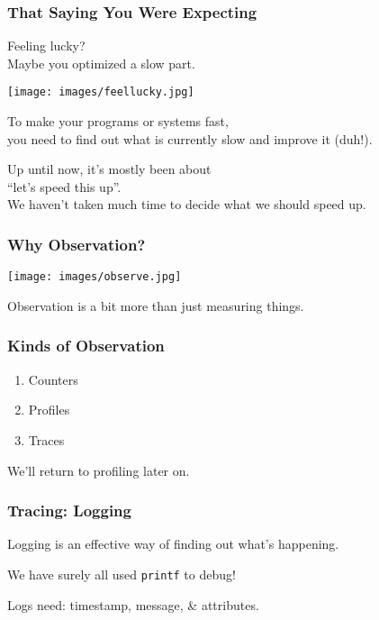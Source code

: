 \begin{frame}
\frametitle{That Saying You Were Expecting}


Feeling lucky? \\
Maybe you optimized a slow part. 

\begin{center}
	\texttt{[image: images/feellucky.jpg]}
\end{center}

To make your programs or systems fast, \\
you need to find out what is currently slow and improve it (duh!). 

Up until now, it's mostly been about \\
\qquad ``let's speed this up''.\\
We haven't taken much time to decide what we should speed up.

\end{frame}


\begin{frame}
\frametitle{Why Observation?}

\begin{center}
	\texttt{[image: images/observe.jpg]}
\end{center}

Observation is a bit more than just measuring things.

\end{frame}


\begin{frame}
\frametitle{Kinds of Observation}

\begin{enumerate}
	\item Counters
	\item Profiles
	\item Traces
\end{enumerate}

We'll return to profiling later on.

\end{frame}


\begin{frame}
\frametitle{Tracing: Logging}

Logging is an effective way of finding out what's happening.

We have surely all used \texttt{printf} to debug!

Logs need: timestamp, message, \& attributes.

\end{frame}


